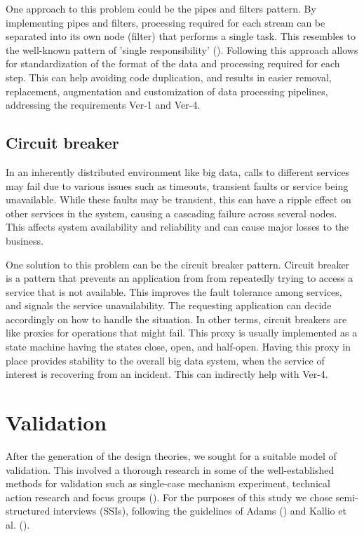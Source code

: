 \documentclass[conference]{IEEEtran}
\begin{document}
One approach to this problem could be the pipes and filters pattern. By implementing pipes and filters, processing required for each stream can be separated into its own node (filter) that performs a single task. This resembles to the well-known pattern of 'single responsibility' (\cite{gamma1995design}). Following this approach allows for standardization of the format of the data and processing required for each step. This can help avoiding code duplication, and results in easier removal, replacement, augmentation and customization of data processing pipelines, addressing the requirements Ver-1 and Ver-4.

\subsection{Circuit breaker}
 
In an inherently distributed environment like big data, calls to different services may fail due to various issues such as timeouts, transient faults or service being unavailable. While these faults may be transient, this can have a ripple effect on other services in the system, causing a cascading failure across several nodes. This affects system availability and reliability and can cause major losses to the business. 

One solution to this problem can be the circuit breaker pattern. Circuit breaker is a pattern that prevents an application from from repeatedly trying to access a service that is not available. This improves the fault tolerance among services, and signals the service unavailability. The requesting application can decide accordingly on how to handle the situation. In other terms, circuit breakers are like proxies for operations that might fail. This proxy is usually implemented as a state machine having the states close, open, and half-open. Having this proxy in place provides stability to the overall big data system, when the service of interest is recovering from an incident. This can indirectly help with Ver-4.




\section{Validation}

After the generation of the design theories, we sought for a suitable model of validation. This involved a thorough research in some of the well-established methods for validation such as single-case mechanism experiment, technical action research and focus groups (\cite{wieringa2014design}). For the purposes of this study we chose semi-structured interviews (SSIs), following the guidelines of Adams (\cite{Adams}) and Kallio et al. (\cite{kallio2016systematic}).  
\end{document}
